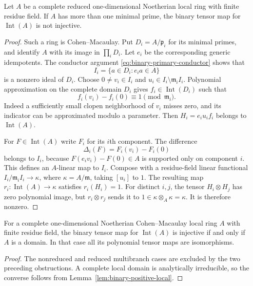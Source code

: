 \begin{lemma}
\label{lem:binary-reduced-branches}
Let $A$ be a complete reduced one-dimensional Noetherian local
ring with finite residue field.  If $A$ has more than one minimal
prime, the binary tensor map for $\operatorname{Int}(A)$ is not
injective.
\end{lemma}
\begin{proof}
Such a ring is Cohen--Macaulay.  Put $D_i=A/\mathfrak p_i$
for its minimal primes, and identify $A$ with its image in
$\prod_iD_i$.  Let $e_i$ be the corresponding generic idempotents.
The conductor argument \eqref{eq:binary-primary-conductor} shows that
\[
 I_i=\{a\in D_i:e_i a\in A\}
\]
is a nonzero ideal of $D_i$.  Choose $0\ne v_i\in I_i$ and
$u_i\in I_i\setminus\mathfrak m_iI_i$.
Polynomial approximation on the complete domain $D_i$ gives
$f_i\in\operatorname{Int}(D_i)$ such that
\[
 f_i(v_i)-f_i(0)\equiv1\pmod{\mathfrak m_i}.
\]
Indeed a sufficiently small clopen neighborhood of $v_i$ misses
zero, and its indicator can be approximated modulo a parameter.
Then $H_i=e_i u_i f_i$ belongs to $\operatorname{Int}(A)$.

For $F\in\operatorname{Int}(A)$ write $F_i$ for its $i$th
component.  The difference
\[
 \Delta_i(F)=F_i(v_i)-F_i(0)
\]
belongs to $I_i$, because $F(e_i v_i)-F(0)\in A$ is supported
only on component $i$.  This defines an $A$-linear map to $I_i$.
Compose with a residue-field linear functional
$I_i/\mathfrak m_iI_i\to\kappa$, where $\kappa=A/\mathfrak m$,
taking $[u_i]$ to $1$.  The resulting map
$r_i:\operatorname{Int}(A)\to\kappa$ satisfies $r_i(H_i)=1$.
For distinct $i,j$, the tensor $H_i\otimes H_j$ has zero
polynomial image, but $r_i\otimes r_j$ sends it to
$1\in\kappa\otimes_A\kappa=\kappa$.  It is therefore nonzero.
\end{proof}

\begin{corollary}
\label{cor:binary-complete-cm}
For a complete one-dimensional Noetherian Cohen--Macaulay local
ring $A$ with finite residue field, the binary tensor map for
$\operatorname{Int}(A)$ is injective if and only if $A$ is a
domain.  In that case all its polynomial tensor maps are
isomorphisms.
\end{corollary}
\begin{proof}
The nonreduced and reduced multibranch cases are excluded by the
two preceding obstructions.  A complete local domain is
analytically irreducible, so the converse follows from
Lemma~\ref{lem:binary-positive-local}.
\end{proof}

